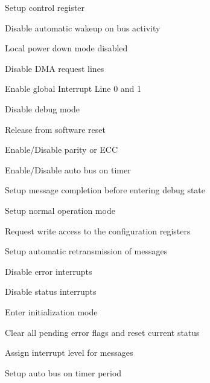 \begin{DoxyItemize}
\item Setup control register
\begin{DoxyItemize}
\item Disable automatic wakeup on bus activity
\item Local power down mode disabled
\item Disable D\+MA request lines
\item Enable global Interrupt Line 0 and 1
\item Disable debug mode
\item Release from software reset
\item Enable/\+Disable parity or E\+CC
\item Enable/\+Disable auto bus on timer
\item Setup message completion before entering debug state
\item Setup normal operation mode
\item Request write access to the configuration registers
\item Setup automatic retransmission of messages
\item Disable error interrupts
\item Disable status interrupts
\item Enter initialization mode
\end{DoxyItemize}
\item Clear all pending error flags and reset current status ~\newline
~\newline
~\newline
~\newline
~\newline
~\newline
~\newline
~\newline

\item Assign interrupt level for messages ~\newline
~\newline
~\newline
~\newline
~\newline
~\newline
~\newline

\item Setup auto bus on timer period ~\newline
~\newline
~\newline
~\newline
~\newline
~\newline


\end{DoxyItemize}
